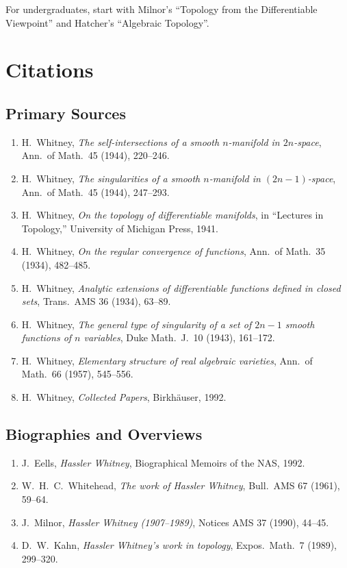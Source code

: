 For undergraduates, start with Milnor's ``Topology from the Differentiable Viewpoint'' and Hatcher's ``Algebraic Topology''.

\section{Citations}\subsection*{Primary Sources}
\begin{enumerate}
    \item H.\ Whitney, \textit{The self-intersections of a smooth $n$-manifold in $2n$-space}, Ann.\ of Math.\ 45 (1944), 220--246.
    \item H.\ Whitney, \textit{The singularities of a smooth $n$-manifold in $(2n-1)$-space}, Ann.\ of Math.\ 45 (1944), 247--293.
    \item H.\ Whitney, \textit{On the topology of differentiable manifolds}, in ``Lectures in Topology,'' University of Michigan Press, 1941.
    \item H.\ Whitney, \textit{On the regular convergence of functions}, Ann.\ of Math.\ 35 (1934), 482--485.
    \item H.\ Whitney, \textit{Analytic extensions of differentiable functions defined in closed sets}, Trans.\ AMS 36 (1934), 63--89.
    \item H.\ Whitney, \textit{The general type of singularity of a set of $2n-1$ smooth functions of $n$ variables}, Duke Math.\ J.\ 10 (1943), 161--172.
    \item H.\ Whitney, \textit{Elementary structure of real algebraic varieties}, Ann.\ of Math.\ 66 (1957), 545--556.
    \item H.\ Whitney, \textit{Collected Papers}, Birkh\"{a}user, 1992.
\end{enumerate}

\subsection*{Biographies and Overviews}
\begin{enumerate}
    \item J.\ Eells, \textit{Hassler Whitney}, Biographical Memoirs of the NAS, 1992.
    \item W.\ H.\ C.\ Whitehead, \textit{The work of Hassler Whitney}, Bull.\ AMS 67 (1961), 59--64.
    \item J.\ Milnor, \textit{Hassler Whitney (1907--1989)}, Notices AMS 37 (1990), 44--45.
    \item D.\ W.\ Kahn, \textit{Hassler Whitney's work in topology}, Expos.\ Math.\ 7 (1989), 299--320.
\end{enumerate}

